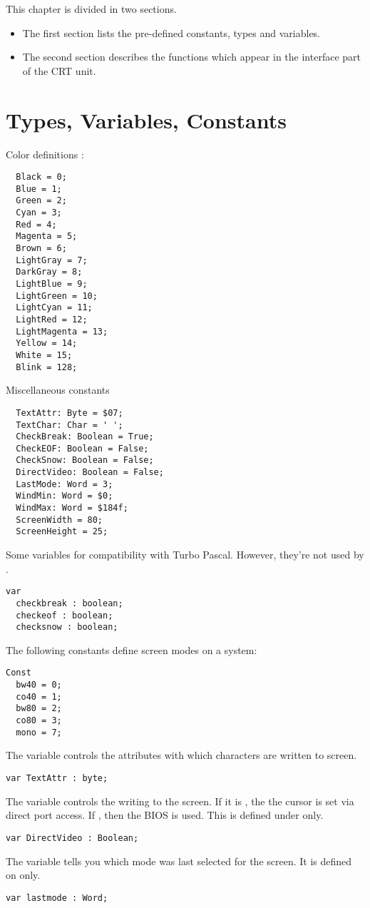 This chapter is divided in two sections. 
\begin{itemize}
\item The first section lists the pre-defined constants, types and variables. 
\item The second section describes the functions which appear in the
interface part of the CRT unit.
\end{itemize}

\section{Types, Variables, Constants}
Color definitions :
\begin{verbatim}
  Black = 0;
  Blue = 1;
  Green = 2;
  Cyan = 3;
  Red = 4;
  Magenta = 5;
  Brown = 6;
  LightGray = 7;
  DarkGray = 8;
  LightBlue = 9;
  LightGreen = 10;
  LightCyan = 11;
  LightRed = 12;
  LightMagenta = 13;
  Yellow = 14;
  White = 15;
  Blink = 128;
\end{verbatim}
Miscellaneous constants
\begin{verbatim}
  TextAttr: Byte = $07;
  TextChar: Char = ' ';
  CheckBreak: Boolean = True;
  CheckEOF: Boolean = False;
  CheckSnow: Boolean = False;
  DirectVideo: Boolean = False;
  LastMode: Word = 3;
  WindMin: Word = $0;
  WindMax: Word = $184f;
  ScreenWidth = 80;
  ScreenHeight = 25;
\end{verbatim}
Some variables for compatibility with Turbo Pascal. However, they're not
used by \fpc.
\begin{verbatim}
var
  checkbreak : boolean;
  checkeof : boolean;
  checksnow : boolean;
\end{verbatim}
The following constants define screen modes on a \dos system:
\begin{verbatim}
Const
  bw40 = 0;
  co40 = 1;
  bw80 = 2;
  co80 = 3;
  mono = 7;
\end{verbatim}
The  variable controls the attributes with which characters
are written to screen.
\begin{verbatim}
var TextAttr : byte;
\end{verbatim}
The  variable controls the writing to the screen. If it is
, the the cursor is set via direct port access. If ,
then the BIOS is used. This is defined under \dos only.
\begin{verbatim}
var DirectVideo : Boolean;
\end{verbatim}
The  variable tells you which mode was last selected for the
screen. It is defined on \dos only.
\begin{verbatim}
var lastmode : Word;
\end{verbatim}

